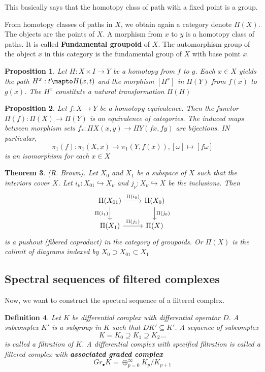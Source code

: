 \documentclass[11pt]{article}
\newtheorem{thm}{Theorem}[section]
\newtheorem{prop}[thm]{Proposition}
\newtheorem{dfn}[thm]{Definition}
\newcommand{\lrta}{\longrightarrow}
\newcommand{\inj}{\hookrightarrow}
\begin{document}
This basically says that the homotopy class of path with a fixed point is a group.

From homotopy classes of paths in $X$, we obtain again a category denote $\Pi(X)$. The objects are the points of $X$. A morphism from $x$ to $y$ is a homotopy class of paths. It is called \textbf{Fundamental groupoid} of $X$. The automorphism group of the object $x$ in this category is the fundamental group of $X$ with base point $x$.

\begin{prop}
Let $H : X  \times I \lrta Y$ be a homotopy from $f$ to $g$. Each $x \in X$ yields the path $H^x:t\mapto H(x,t)$ and the morphism $[H^x]$ in $\Pi(Y)$ from $f(x)$ to $g(x)$. The $H^x$ constitute a natural transformation $\Pi(H)$
\end{prop}
\begin{prop}
 Let $f : X \lrta Y$ be a homotopy equivalence. Then the functor $\Pi(f):\Pi(X)\lrta \Pi(Y)$ is an equivalence of categories. The induced maps between morphism sets $f_*:\Pi X(x,y)\lrta \Pi Y(fx,fy)$ are bijections. IN particular,
 $$
 \pi_1(f):\pi_1(X,x)\lrta \pi_1(Y,f(x)), [\omega]\mapsto [f\omega]
 $$
 is an isomorphism for each $x\in X$
\end{prop}

\begin{thm}
(R. Brown). Let $X_0$ and $X_1$ be a subspace of $X$ such that the interiors cover $X$. Let $i_\nu:X_{01}\inj X_\nu$ and $j_\nu:X_\nu\inj X$ be the inclusions. Then 
\[
\begin{tikzcd}
\Pi(X_{01}) \arrow[r, "\Pi(i_0)"] \arrow[d, "\Pi(i_1)"'] & \Pi(X_0) \arrow[d, "\Pi(j_0)"] \\
\Pi(X_1) \arrow[r, "\Pi(j_1)"] & \Pi(X)
\end{tikzcd}
\]
 is a pushout (fibered coproduct) in the category of groupoids. Or $\Pi(X)$  is the colimit of diagrams indexed by $X_0\supset X_{01}\subset X_1$
 \end{thm}


\subsection{Spectral sequences of filtered complexes}
Now, we want to construct the spectral sequence of a filtered complex.
\begin{dfn}
Let $K$ be differential complex with differential operator $D$. A subcomplex $K'$ is a subgroup in $K$ such that $DK'\subseteq K'$. A sequence of subcomplex 
$$K=K_0\supseteq K_1\supseteq K_2...$$
is called a filtration of $K$. A differential complex with specified filtration is called a filtered complex with  
\textbf{associated graded complex}
$$
Gr_{\bullet} K=\oplus^\infty_{p=0} K_p/K_{p+1}
$$
\end{dfn} 
\end{document}
